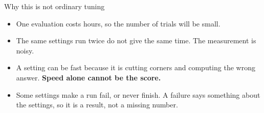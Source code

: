 \documentclass[aspectratio=169,11pt]{beamer}
\begin{document}
\begin{frame}{Why this is not ordinary tuning}
  \begin{itemize}
    \item One evaluation costs hours, so the number of trials will be small.
    \item The same settings run twice do not give the same time. The
          measurement is noisy.
    \item A setting can be fast because it is cutting corners and computing the
          wrong answer. \textbf{Speed alone cannot be the score.}
    \item Some settings make a run fail, or never finish. A failure says
          something about the settings, so it is a result, not a missing
          number.
  \end{itemize}
\end{frame}
\end{document}
